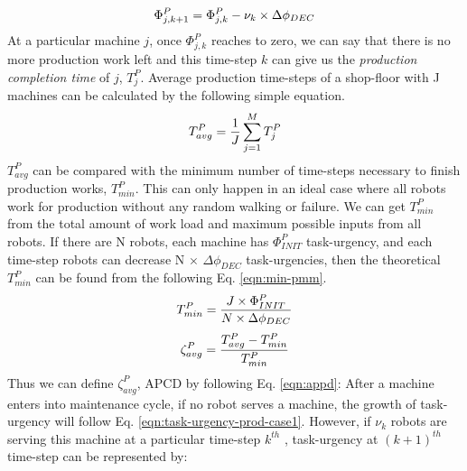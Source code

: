 \documentclass[journal]{IEEEtran}
\begin{document}
\begin{equation}
\begin{small}
\Phi_{j, k+1}^{P} = \Phi_{j, k}^{P} - \nu_{k} \times \Delta \phi_{DEC}
\label{eqn:task-urgency-prod-case2}
\end{small}
\end{equation}
At a particular machine $j$, once $\Phi_{j, k}^{P}$ reaches to zero, we can say that there is no more production work left and this time-step $k$ can give us the {\em production completion time} of $j$, $T_{j}^{P}$. Average production time-steps of a shop-floor with J machines can be calculated by the following simple equation.
\begin{equation}
\begin{small}
T_{avg}^{P} = \frac{1}{J} \sum_{j=1}^{M} T_{j}^{P} 
\label{eqn:avg-pmm}
\end{small}
\end{equation}
$T_{avg}^{P}$ can be compared with the minimum number of time-steps necessary to finish production works, $T_{min}^{P}$. This can only happen in an ideal case where all robots work for production without any random walking or failure. We can get $T_{min}^{P}$ from the total amount of work load and maximum possible inputs from all robots. If there are N robots, each machine has $\Phi_{INIT}^{P}$ task-urgency, and each time-step robots can decrease N $\times$ $\Delta \phi_{DEC}$ task-urgencies, then the theoretical $T_{min}^{P}$ can be found from the following Eq. \ref{eqn:min-pmm}.
%
\begin{equation}
\begin{small}
T_{min}^{P} = \frac{J \times \Phi_{INIT}^{P}}{N \times \Delta \phi_{DEC}} 
\label{eqn:min-pmm}
\end{small}
\end{equation}
\begin{equation}
\begin{small}
\zeta_{avg}^{P} = \frac{T_{avg}^{P} - T_{min}^{P}}{T_{min}^{P}} 
\label{eqn:appd}
\end{small}
\end{equation}
Thus we can define $\zeta_{avg}^{P}$, \acf{APCD} by following Eq. \ref{eqn:appd}:
After a machine enters into maintenance cycle, if no robot serves a machine, the growth of task-urgency will follow Eq. \ref{eqn:task-urgency-prod-case1}. However, if $\nu_{k}$ robots are serving this machine at a particular time-step $k^{th}$ , task-urgency at $(k+1)^{th}$ time-step can be represented by:
\end{document}
